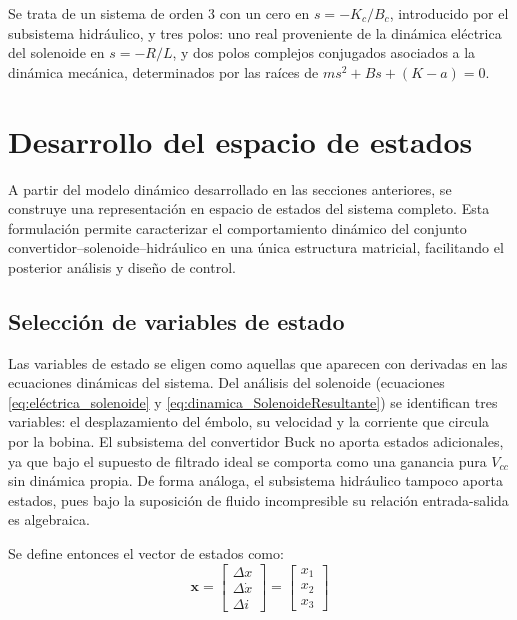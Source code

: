\documentclass[journal]{IEEEtran}
\begin{document}
Se trata de un sistema de orden 3 con un cero en $s = -K_c/B_c$, introducido 
por el subsistema hidráulico, y tres polos: uno real proveniente de la dinámica 
eléctrica del solenoide en $s = -R/L$, y dos polos complejos conjugados 
asociados a la dinámica mecánica, determinados por las raíces de 
$ms^2 + Bs + (K-a) = 0$.
\section{Desarrollo del espacio de estados}

A partir del modelo dinámico desarrollado en las secciones anteriores, se 
construye una representación en espacio de estados del sistema completo. 
Esta formulación permite caracterizar el comportamiento dinámico del 
conjunto convertidor--solenoide--hidráulico en una única estructura 
matricial, facilitando el posterior análisis y diseño de control.

\setlength{\parskip}{1em}

\subsection{Selección de variables de estado}

Las variables de estado se eligen como aquellas que aparecen con derivadas 
en las ecuaciones dinámicas del sistema. Del análisis del solenoide 
(ecuaciones \ref{eq:eléctrica_solenoide} y \ref{eq:dinamica_SolenoideResultante}) 
se identifican tres variables: el desplazamiento del émbolo, su velocidad y 
la corriente que circula por la bobina. El subsistema del convertidor Buck 
no aporta estados adicionales, ya que bajo el supuesto de filtrado ideal se 
comporta como una ganancia pura $V_{cc}$ sin dinámica propia. De forma 
análoga, el subsistema hidráulico tampoco aporta estados, pues bajo la 
suposición de fluido incompresible su relación entrada-salida es algebraica.

\setlength{\parskip}{1em}

Se define entonces el vector de estados como:
\begin{equation}
    \mathbf{x} = 
    \begin{bmatrix}
        \Delta x \\
        \Delta \dot{x} \\
        \Delta i
    \end{bmatrix}
    =
    \begin{bmatrix}
        x_1 \\
        x_2 \\
        x_3
    \end{bmatrix}
\label{eq:vector_estados}
\end{equation}
\end{document}
